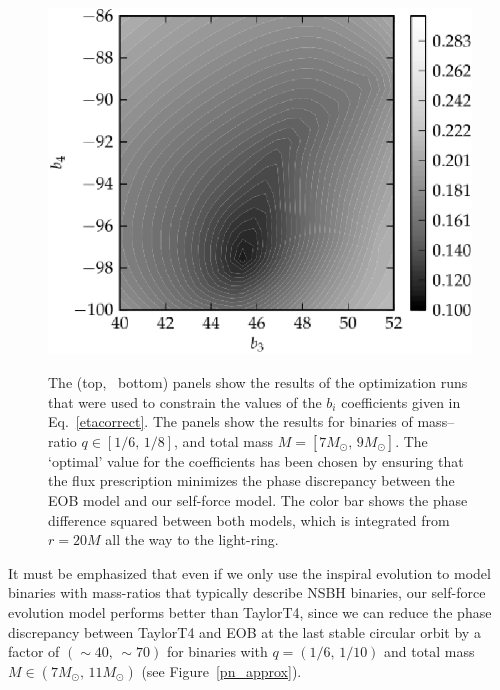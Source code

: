 \begin{figure}
{\includegraphics[height=0.5\textwidth,  clip]{figures/imrimri/b3b4_mapb3b4m1m8no.eps}
}
\caption{The (top, \, bottom) panels show the results of the optimization runs that were used to constrain the values of the \(b_i\) coefficients given in Eq.~\eqref{etacorrect}. The panels show the results for binaries of mass--ratio \(q\in [1/6,\, 1/8]\), and total mass \(M= [7M_{\odot},\,   9M_{\odot}]\). The `optimal' value for the coefficients has been chosen by ensuring that the flux prescription minimizes the phase discrepancy between the EOB model and our self-force model. The color bar shows the phase difference squared between both models, which is integrated from \(r=20M\) all the way to the light-ring.} 
\label{bimaps}
\end{figure}

It must be emphasized that even if we only use the inspiral evolution to model binaries with mass-ratios that typically describe NSBH binaries, our self-force evolution model performs better than TaylorT4, since we can reduce the phase discrepancy between TaylorT4 and EOB at the last stable circular orbit by a factor of \((\sim40, \, \sim70)\)  for binaries with \(q=(1/6,\,1/10)\)  and total mass \(M\in (7M_{\odot} ,\, 11M_{\odot} )\) (see Figure~\ref{pn_approx}).


